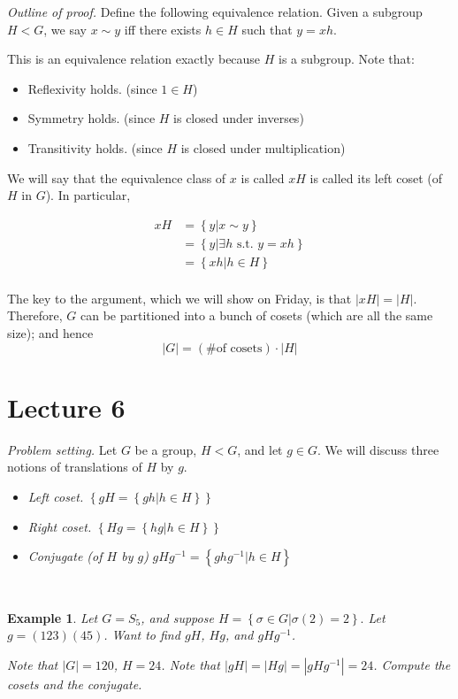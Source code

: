 \documentclass[12pt]{article}
\newtheorem*{example}{Example}
\begin{document}
{\it Outline of proof.}  Define the following equivalence relation.  Given a subgroup $H < G$, we say $x \sim y$ iff there exists $h \in H$ such that $y = xh$.

This is an equivalence relation exactly because $H$ is a subgroup.  Note that:
\begin{itemize}
  \item Reflexivity holds.  (since $1 \in H$)
  \item Symmetry holds. (since $H$ is closed under inverses)
  \item Transitivity holds. (since $H$ is closed under multiplication)
\end{itemize}

We will say that the equivalence class of $x$ is called $xH$ is called its left coset (of $H$ in $G$).  In particular,

\begin{align*}
  xH &= \left\{ y | x \sim y \right\} \\
  &= \left\{ y | \exists h \text{ s.t. } y = xh \right\} \\
  &= \left\{ xh | h \in H \right\} \\
\end{align*}

The key to the argument, which we will show on Friday, is that $|xH| = |H|$.  Therefore, $G$ can be partitioned into a bunch of cosets (which are all the same size); and hence
\[
  |G| = (\text{\# of cosets}) \cdot |H|
\]
\section{Lecture 6}

{\it Problem setting.} Let $G$ be a group, $H < G$, and let $g \in G$.  We will discuss three notions of translations of $H$ by $g$.

\begin{itemize}
  \item {\it Left coset.} $\left\{ gH = \left\{ gh | h \in H \right\} \right\}$
  \item {\it Right coset.} $\left\{ Hg = \left\{ hg | h \in H \right\} \right\}$
  \item {\it Conjugate (of $H$ by $g$)} $gHg^{-1} = \left\{ ghg^{-1} | h \in H \right\}$
\end{itemize} \\

\begin{example}
  Let $G = S_5$, and suppose $H = \left\{ \sigma \in G | \sigma(2) = 2 \right\}.$  Let $g = (1 2 3)(4 5)$.  Want to find $gH$, $Hg$, and $gHg^{-1}$.

  Note that $|G| = 120$, $H = 24$.  Note that $|gH| = |Hg| = |gHg^{-1}| = 24$.  Compute the cosets and the conjugate.
\end{example}
\end{document}
